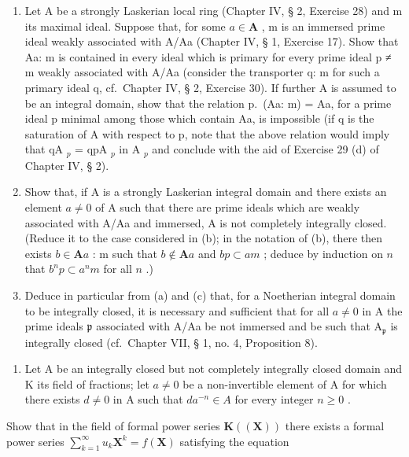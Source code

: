 \begin{enumerate}
\def\labelenumi{(\alph{enumi})}
\setcounter{enumi}{1}
\item
  Let A be a strongly Laskerian local ring (Chapter IV, § 2, Exercise 28) and m its maximal ideal. Suppose that, for some \(a \in \mathbf{A}\) , m is an immersed prime ideal weakly associated with A/Aa (Chapter IV, § 1, Exercise 17). Show that Aa: m is contained in every ideal which is primary for every prime ideal p ≠ m weakly associated with A/Aa (consider the transporter q: m for such a primary ideal q, cf.~Chapter IV, § 2, Exercise 30). If further A is assumed to be an integral domain, show that the relation p.~(Aa: m) = Aa, for a prime ideal p minimal among those which contain Aa, is impossible (if q is the saturation of A with respect to p, note that the above relation would imply that qA \(_{p}\) = qpA \(_{p}\) in A \(_{p}\) and conclude with the aid of Exercise 29 (d) of Chapter IV, § 2).
\item
  Show that, if A is a strongly Laskerian integral domain and there exists an element \(a \neq 0\) of A such that there are prime ideals which are weakly associated with A/Aa and immersed, A is not completely integrally closed. (Reduce it to the case considered in (b); in the notation of (b), there then exists \(b \in \mathbf{A}a\) : m such that \(b \notin \mathbf{A}a\) and \(bp \subset am\) ; deduce by induction on \(n\) that \(b^n p \subset a^n m\) for all \(n\) .)
\item
  Deduce in particular from (a) and (c) that, for a Noetherian integral domain to be integrally closed, it is necessary and sufficient that for all \(a \neq 0\) in A the prime ideals \(\mathfrak{p}\) associated with A/Aa be not immersed and be such that \(\mathrm{A}_{\mathfrak{p}}\) is integrally closed (cf.~Chapter VII, § 1, no. 4, Proposition 8).
\end{enumerate}

\begin{enumerate}
\def\labelenumi{\arabic{enumi}.}
\setcounter{enumi}{26}
\tightlist
\item
  Let A be an integrally closed but not completely integrally closed domain and K its field of fractions; let \(a \neq 0\) be a non-invertible element of A for which there exists \(d \neq 0\) in A such that \(da^{-n} \in A\) for every integer \(n \geqslant 0\) .
\end{enumerate}

Show that in the field of formal power series \(\mathbf{K}((\mathbf{X}))\) there exists a formal power series \(\sum_{k=1}^{\infty} u_k \mathbf{X}^k = f(\mathbf{X})\) satisfying the equation

